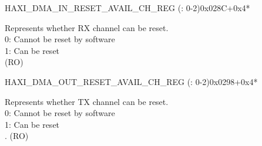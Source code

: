 \begin{register}{H}{AXI\_DMA\_IN\_RESET\_AVAIL\_CH\_REG (: 0-2)}{0x028C+0x4*}\label{regdesc:AXIDMAINRESETAVAILCHNREG}
%
%
\regnewline%
\begin{regdesc}\begin{reglist}
\label{fielddesc:AXIDMAINRESETAVAILCHN}\item [AXI\_DMA\_IN\_RESET\_AVAIL\_CH\regindex{n}] Represents whether RX channel  can be reset.\\
0: Cannot be reset by software\\
1: Can be reset\\ (RO)
\end{reglist}\end{regdesc}
\end{register}


\begin{register}{H}{AXI\_DMA\_OUT\_RESET\_AVAIL\_CH\_REG (: 0-2)}{0x0298+0x4*}\label{regdesc:AXIDMAOUTRESETAVAILCHNREG}
%
%
\regnewline%
\begin{regdesc}\begin{reglist}
\label{fielddesc:AXIDMAOUTRESETAVAILCHN}\item [AXI\_DMA\_OUT\_RESET\_AVAIL\_CH\regindex{n}] Represents whether TX channel  can be reset.\\
0: Cannot be reset by software\\
1: Can be reset\\. (RO)
\end{reglist}\end{regdesc}
\end{register}


